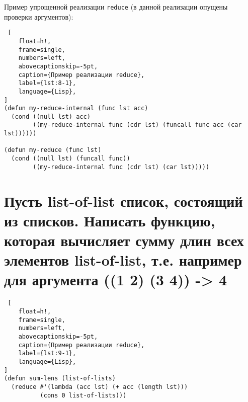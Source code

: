 Пример упрощенной реализации \texttt{reduce} (в данной реализации опущены проверки аргументов):

\begin{lstlisting} [
	float=h!,
	frame=single,
	numbers=left,
	abovecaptionskip=-5pt,
	caption={Пример реализации reduce},
	label={lst:8-1},
	language={Lisp},
]
(defun my-reduce-internal (func lst acc)
  (cond ((null lst) acc)
        ((my-reduce-internal func (cdr lst) (funcall func acc (car lst))))))

(defun my-reduce (func lst)
  (cond ((null lst) (funcall func))
        ((my-reduce-internal func (cdr lst) (car lst)))))
\end{lstlisting}

\section{Пусть list-of-list список, состоящий из списков. Написать функцию, которая вычисляет сумму длин всех элементов list-of-list, т.е. например для аргумента ((1 2) (3 4)) -> 4}

\begin{lstlisting} [
	float=h!,
	frame=single,
	numbers=left,
	abovecaptionskip=-5pt,
	caption={Пример реализации reduce},
	label={lst:9-1},
	language={Lisp},
]
(defun sum-lens (list-of-lists)
  (reduce #'(lambda (acc lst) (+ acc (length lst)))
          (cons 0 list-of-lists)))
\end{lstlisting}